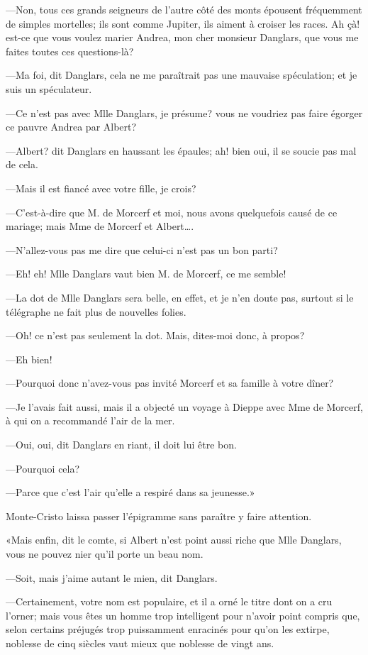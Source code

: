 —Non, tous ces grands seigneurs de l'autre côté des monts épousent fréquemment de simples mortelles; ils sont comme Jupiter, ils aiment à croiser les races. Ah çà! est-ce que vous voulez marier Andrea, mon cher monsieur Danglars, que vous me faites toutes ces questions-là?  

—Ma foi, dit Danglars, cela ne me paraîtrait pas une mauvaise spéculation; et je suis un spéculateur. 

—Ce n'est pas avec Mlle Danglars, je présume? vous ne voudriez pas faire égorger ce pauvre Andrea par Albert? 

—Albert? dit Danglars en haussant les épaules; ah! bien oui, il se soucie pas mal de cela. 

—Mais il est fiancé avec votre fille, je crois? 

—C'est-à-dire que M. de Morcerf et moi, nous avons quelquefois causé de ce mariage; mais Mme de Morcerf et Albert\dots. 

—N'allez-vous pas me dire que celui-ci n'est pas un bon parti? 

—Eh! eh! Mlle Danglars vaut bien M. de Morcerf, ce me semble! 

—La dot de Mlle Danglars sera belle, en effet, et je n'en doute pas, surtout si le télégraphe ne fait plus de nouvelles folies. 

—Oh! ce n'est pas seulement la dot. Mais, dites-moi donc, à propos? 

—Eh bien! 

—Pourquoi donc n'avez-vous pas invité Morcerf et sa famille à votre dîner? 

—Je l'avais fait aussi, mais il a objecté un voyage à Dieppe avec Mme de Morcerf, à qui on a recommandé l'air de la mer.  

—Oui, oui, dit Danglars en riant, il doit lui être bon. 

—Pourquoi cela? 

—Parce que c'est l'air qu'elle a respiré dans sa jeunesse.» 

Monte-Cristo laissa passer l'épigramme sans paraître y faire attention. 

«Mais enfin, dit le comte, si Albert n'est point aussi riche que Mlle Danglars, vous ne pouvez nier qu'il porte un beau nom. 

—Soit, mais j'aime autant le mien, dit Danglars. 

—Certainement, votre nom est populaire, et il a orné le titre dont on a cru l'orner; mais vous êtes un homme trop intelligent pour n'avoir point compris que, selon certains préjugés trop puissamment enracinés pour qu'on les extirpe, noblesse de cinq siècles vaut mieux que noblesse de vingt ans. 

